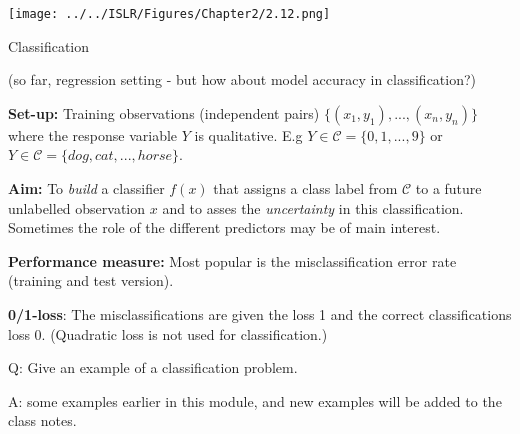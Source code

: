 \documentclass[ignorenonframetext,]{beamer}
\begin{document}
\begin{frame}

\texttt{[image: ../../ISLR/Figures/Chapter2/2.12.png]}

\end{frame}

\begin{frame}{Classification}

(so far, regression setting - but how about model accuracy in
classification?)

\textbf{Set-up:} Training observations (independent pairs)
\(\{(x_1, y_1), ..., (x_n, y_n)\}\) where the response variable \(Y\) is
qualitative. E.g \(Y \in \mathcal{C} = \{0, 1, ..., 9\}\) or
\(Y \in \mathcal{C} = \{dog, cat,... ,horse\}\).

\textbf{Aim: } To \emph{build} a classifier \(f(x)\) that assigns a
class label from \(\mathcal{C}\) to a future unlabelled observation
\(x\) and to asses the \emph{uncertainty} in this classification.
Sometimes the role of the different predictors may be of main interest.

\textbf{Performance measure:} Most popular is the misclassification
error rate (training and test version).

\textbf{0/1-loss}: The misclassifications are given the loss 1 and the
correct classifications loss 0. (Quadratic loss is not used for
classification.)

\begin{block}{Q: Give an example of a classification problem.}

\end{block}

\end{frame}

\begin{frame}

\begin{block}{A: some examples earlier in this module, and new examples
will be added to the class notes.}

\end{block}

\end{frame}
\end{document}
